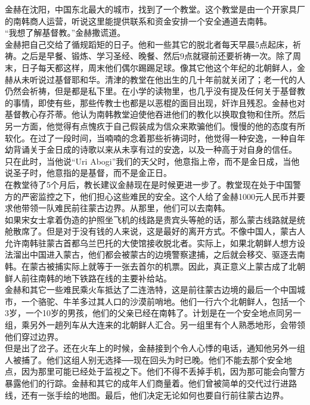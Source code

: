 \begin{multicols}{\theparacolNo}
金赫在沈阳，中国东北最大的城市，找到了一个教堂。这个教堂是由一个开家具厂的南韩商人运营，听说这里能提供联系和资金安排一个安全通道去南韩。\\

“我想了解基督教。”金赫撒谎道。\\

金赫把自己交给了循规蹈矩的日子。他和一些其它的脱北者每天早晨5点起床，祈祷。之后是早餐、锻炼、学习圣经、晚餐、然后9点就寝前还要祈祷一次。除了周末，日子每天都这样，周末他们偶尔踢踢足球。像其它他这个年纪的北朝鲜人，金赫从未听说过基督耶和华。清津的教堂在他出生的几十年前就关闭了；老一代的人仍然会祈祷，但是都是私下里。在小学的读物里，也几乎没有提及任何关于基督教的事情，即使有些，那些传教士也都是以恶棍的面目出现，奸诈且残忍。金赫也对基督教心存芥蒂。他认为南韩教堂迫使他吞进他们的教化以换取食物和住所。然后另一方面，他觉得有点愧疚于自己假装成为信众来欺骗他们。慢慢的他的态度有所软化。在过了一段时间，当喃喃的念着那些祈祷词时，他觉得一种安逸，一种自年幼背诵关于金日成的诗歌以来从未享有过的安逸，以及一种高于对自身的信任。\\

只在此时，当他说“Uri Abogi”我们的天父时，他意指上帝，而不是金日成，当他说圣子时，他意指的是基督，而不是金正日。\\

在教堂待了5个月后，教长建议金赫现在是时候更进一步了。教堂现在处于中国警方的严密监控之下，他们担心这些难民的安全。这个人给了金赫1000元人民币并要求他带领一队难民前往蒙古边界。从那里，他们可以去南韩。\\

如果宋女士拿着伪造的护照坐飞机的线路是贵宾头等舱的话，那么蒙古线路就是统舱散席了。但是对于没有钱的人来说，这是最好的离开方式。不像中国人，蒙古人允许南韩驻蒙古首都乌兰巴托的大使馆接收脱北者。实际上，如果北朝鲜人想方设法溜出中国进入蒙古，他们都会被蒙古的边境警察逮捕，之后就会移交、驱逐去南韩。在蒙古被捕实际上就等于一张去首尔的机票。因此，真正意义上蒙古成了北朝鲜人前往南韩的地下铁路在线的主要补给站。\\

金赫和其它一些难民乘火车抵达了二连浩特，这是前往蒙古边境的最后一个中国城市，一个骆驼、牛羊多过其人口的沙漠前哨地。他们一行六个北朝鲜人，包括一个3岁，一个10岁的男孩，他们的父亲已经在南韩了。计划是在一个安全地点同另一组，乘另外一趟列车从大连来的北朝鲜人汇合。另一组里有个人熟悉地形，会带领他们穿过边界。\\

但是出了岔子。还在火车上的时候，金赫接到个令人心悸的电话，通知他另外一组人被捕了。他们这组人别无选择──现在回头为时已晚。他们不能去那个安全地点，因为那里可能已经处于监视之下。他们不得不丢掉手机，因为那可能会向警方暴露他们的行踪。金赫和其它的成年人们商量着。他们曾被简单的交代过行进路线，还有一张手绘的地图。最后，他们决定无论如何也要自行前往蒙古边界。\\


\end{multicols}
